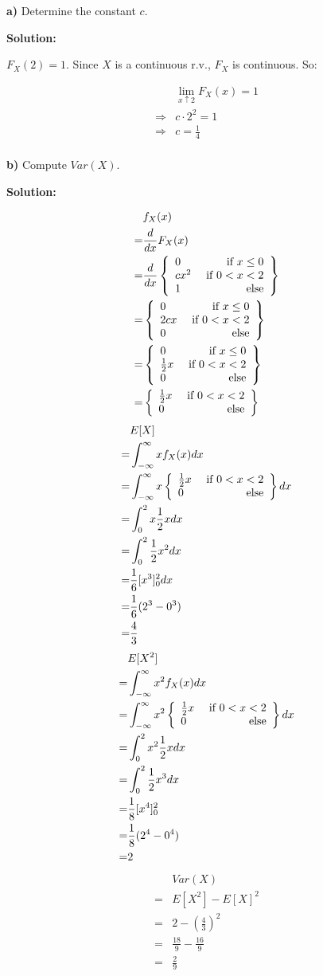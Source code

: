 \documentclass{article}
\begin{document}
\textbf{a)} Determine the constant \(c\).

\textbf{Solution:}

\(F_X(2)=1\). Since \(X\) is a continuous r.v., \(F_X\) is continuous. So:

\begin{align*}
	 & \lim_{x\uparrow 2}F_X(x)=1 \\
	\Rightarrow & c\cdot 2^2=1 \\
	\Rightarrow & c=\frac14 \\
\end{align*}

\textbf{b)} Compute \(Var(X)\).

\textbf{Solution:}

\begin{align*}
	 & f_X(x) \\
	=& \frac{d}{dx}F_X(x) \\
	=& \frac{d}{dx}\left\{\begin{array}{lr}0 & \text{ if }x\leq 0\\ cx^2 & \text{ if }0<x<2 \\1 & \text{ else}\end{array}\right\} \\
	=& \left\{\begin{array}{lr}0 & \text{ if }x\leq 0\\ 2cx & \text{ if }0<x<2 \\0 & \text{ else}\end{array}\right\} \\
	=& \left\{\begin{array}{lr}0 & \text{ if }x\leq 0\\ \frac12x & \text{ if }0<x<2 \\0 & \text{ else}\end{array}\right\} \\
	=& \left\{\begin{array}{lr}\frac12x & \text{ if }0<x<2\\0 & \text{ else}\end{array}\right\} \\
\end{align*}
\begin{align*}
	 & E[X] \\
	=& \int_{-\infty}^\infty x f_X(x)dx \\
	=& \int_{-\infty}^\infty x \left\{\begin{array}{lr}\frac12x & \text{ if }0<x<2\\0 & \text{ else}\end{array}\right\}dx \\
	=& \int_{0}^2 x \frac12x dx \\
	=& \int_{0}^2 \frac12x^2 dx \\
	=& \frac16\lbrack x^3\rbrack_0^2 dx \\
	=& \frac16(2^3-0^3) \\
	=& \frac{4}{3} \\
\end{align*}
\begin{align*}
	 & E[X^2] \\
	=& \int_{-\infty}^\infty x^2 f_X(x)dx \\
	=& \int_{-\infty}^\infty x^2 \left\{\begin{array}{lr}\frac12x & \text{ if }0<x<2\\0 & \text{ else}\end{array}\right\}dx \\
	=& \int_{0}^2 x^2 \frac12x dx \\
	=& \int_{0}^2 \frac12x^3 dx \\
	=& \frac18\lbrack x^4\rbrack_0^2 \\
	=& \frac18(2^4-0^4) \\
	=& 2 \\
\end{align*}
\begin{align*}
	 & Var(X) \\
	=& E[X^2]-E[X]^2 \\
	=& 2-\left(\frac{4}{3}\right)^2 \\
	=& \frac{18}{9}-\frac{16}{9} \\
	=& \frac{2}{9} \\
\end{align*}
\end{document}
